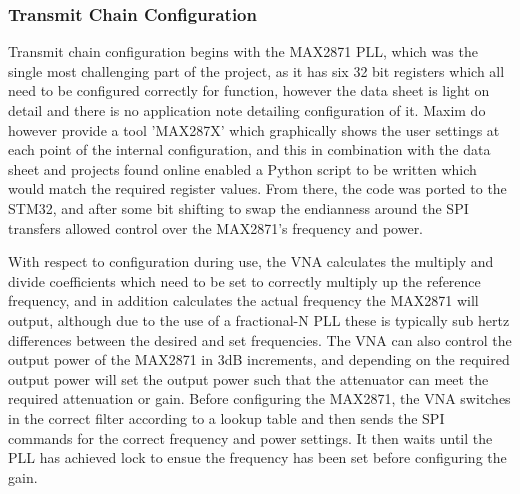 \subsubsection{Transmit Chain Configuration}
Transmit chain configuration begins with the MAX2871 PLL, which was the single most challenging part of the project, as it has six 32 bit registers which all need to be configured correctly for function, however the data sheet is light on detail and there is no application note detailing configuration of it. Maxim do however provide a tool 'MAX287X' which graphically shows the user settings at each point of the internal configuration, and this in combination with the data sheet and projects found online \cite{max2871_trans} \cite{max2871_synth} enabled a Python script to be written which would match the required register values. From there, the code was ported to the STM32, and after some bit shifting to swap the endianness around the SPI transfers allowed control over the MAX2871's frequency and power. 

With respect to configuration during use, the VNA calculates the multiply and divide coefficients which need to be set to correctly multiply up the reference frequency, and in addition calculates the actual frequency the MAX2871 will output, although due to the use of a fractional-N PLL these is typically sub hertz differences between the desired and set frequencies. The VNA can also control the output power of the MAX2871 in 3dB increments, and depending on the required output power will set the output power such that the attenuator can meet the required attenuation or gain. Before configuring the MAX2871, the VNA switches in the correct filter according to a lookup table and then sends the SPI commands for the correct frequency and power settings. It then waits until the PLL has achieved lock to ensue the frequency has been set before configuring the gain. 

